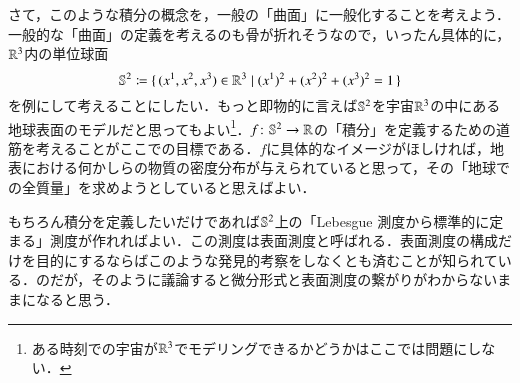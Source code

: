 さて，このような積分の概念を，一般の「曲面」に一般化することを考えよう．一般的な「曲面」の定義を考えるのも骨が折れそうなので，いったん具体的に，$\mathbb{R}^3$内の単位球面
\begin{equation}
\mathbb{S}^2 \coloneqq \set{ (x^1, x^2, x^3) \in \mathbb{R}^3 | (x^1)^2 + (x^2)^2 + (x^3)^2 = 1}
\end{equation}を例にして考えることにしたい．もっと即物的に言えば$\mathbb{S}^2$を宇宙$\mathbb{R}^3$の中にある地球表面のモデルだと思ってもよい\footnote{ある時刻での宇宙が$\mathbb{R}^3$でモデリングできるかどうかはここでは問題にしない．}．$f \colon \mathbb{S}^2 \to \mathbb{R}$の「積分」を定義するための道筋を考えることがここでの目標である．$f$に具体的なイメージがほしければ，地表における何かしらの物質の密度分布が与えられていると思って，その「地球での全質量」を求めようとしていると思えばよい．

\begin{que}[*]
もちろん積分を定義したいだけであれば$\mathbb{S}^2$上の「Lebesgue 測度から標準的に定まる」測度が作れればよい．この測度は表面測度と呼ばれる．表面測度の構成だけを目的にするならばこのような発見的考察をしなくとも済むことが知られている．のだが，そのように議論すると微分形式と表面測度の繋がりがわからないままになると思う．
\end{que}

